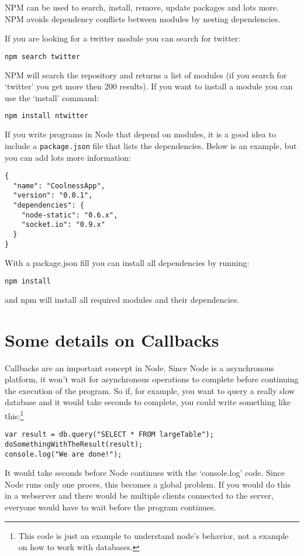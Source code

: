 \documentclass[a4paper]{report}
\begin{document}
NPM can be used to search, install, remove, update packages and lots more. NPM avoids dependency conflicts between modules by nesting dependencies.

If you are looking for a twitter module you can search for twitter:
\begin{lstlisting}[language=bash]
npm search twitter
\end{lstlisting}
NPM will search the repository and returns a list of modules (if you search for `twitter' you get more then 200 results). If you want to install a module you can use the `install' command: 
\begin{lstlisting}[language=bash]
npm install ntwitter
\end{lstlisting}
If you write programs in Node that depend on modules, it is a good idea to include a \texttt{package.json} file that lists the dependencies. Below is an example, but you can add lots more information:
\begin{lstlisting}
{
  "name": "CoolnessApp",
  "version": "0.0.1",
  "dependencies": {
    "node-static": "0.6.x",
    "socket.io": "0.9.x"
  }
}
\end{lstlisting}

\noindent With a package.json fill you can install all dependencies by running:
\begin{lstlisting}[language=bash]
npm install
\end{lstlisting}
\noindent and npm will install all required modules and their dependencies.

\section*{Some details on Callbacks}
Callbacks are an important concept in Node. Since Node is a asynchronous platform, it won't wait for asynchronous operations to complete before continuing the execution of the program. So if, for example, you want to query a really slow database and it would take seconds to complete, you could write something like this:\footnote{This code is just an example to understand node's behavior, not a example on how to work with databases.}
\begin{lstlisting}
var result = db.query("SELECT * FROM largeTable");
doSomethingWithTheResult(result);
console.log("We are done!");
\end{lstlisting}
\noindent It would take seconds before Node continues with the `console.log' code. Since Node runs only one proces, this becomes a global problem. If you would do this in a webserver and there would be multiple clients connected to the server, everyone would have to wait before the program continues. 
\end{document}
